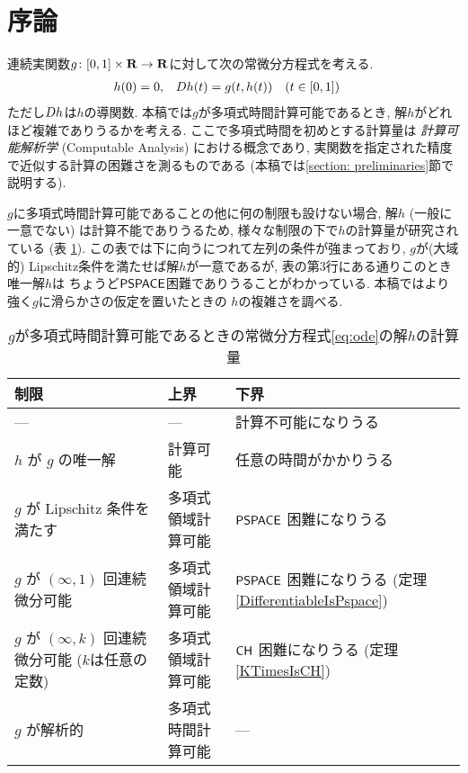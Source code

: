 \section{序論}

連続実関数$g \colon [0,1] \times \mathbf R \to \mathbf R$に対して次の常微分方程式を考える. 
\begin{align}
 \label{eq:ode}
 h(0) & = 0, &
 D h(t) & = g(t,h(t)) \quad (t \in [0,1])
\end{align}
ただし$D h$は$h$の導関数.
本稿では$g$が多項式時間計算可能であるとき, 
解$h$がどれほど複雑でありうるかを考える.
ここで多項式時間を初めとする計算量は
\emph{計算可能解析学} (Computable Analysis) 
\cite{weihrauch00:_comput_analy}における概念であり, 
実関数を指定された精度で近似する計算の困難さを測るものである
(本稿では\ref{section: preliminaries}節で説明する). 

$g$に多項式時間計算可能であることの他に何の制限も設けない場合, 
解$h$ (一般に一意でない) は計算不能でありうるため,
様々な制限の下で$h$の計算量が研究されている (表 \ref{table:related}).
この表では下に向うにつれて左列の条件が強まっており, 
$g$が(大域的) Lipschitz条件を満たせば解$h$が一意であるが, 
表の第3行にある通りこのとき唯一解$h$は
ちょうど$\mathsf{PSPACE}$困難でありうることがわかっている\cite{kawamura2010lipschitz}. 
本稿ではより強く$g$に滑らかさの仮定を置いたときの
$h$の複雑さを調べる. 

\begin{table}
\renewcommand\arraystretch{1.3}
\begin{center}
 \caption{$g$が多項式時間計算可能であるときの常微分方程式\eqref{eq:ode}の解$h$の計算量}
 \label{table:related}
 \begin{tabular}{lll}
  制限 & 上界 & 下界 \\
  \hline
   --- & --- & 計算不可能になりうる \cite{pour1979computable} \\
  $h$ が $g$ の唯一解 & 計算可能 \cite{coddington1955theory}
  & 任意の時間がかかりうる \cite{ko1983computational, miller1970recursive} \\
  $g$ が Lipschitz 条件を満たす & 多項式領域計算可能 \cite{ko1983computational}
      &	$\mathsf{PSPACE}$ 困難になりうる \cite{kawamura2010lipschitz}\\
  $g$ が $(\infty, 1)$ 回連続微分可能 & 多項式領域計算可能 & \parbox[t]{14zw}{$\mathsf{PSPACE}$ 困難になりうる\\{}(定理\ref{DifferentiableIsPspace})} \\
  \parbox[t]{14zw}{$g$ が $(\infty, k)$ 回連続微分可能\\{}($k$は任意の定数)}
  & 多項式領域計算可能 & \parbox[t]{14zw}{$\mathsf{CH}$ 困難になりうる\\{}(定理\ref{KTimesIsCH})} \\
  $g$ が解析的 
  & 多項式時間計算可能 \cite{muller1987uniform, ko1988computing, kawamura2010complexity} 
  & ---
 \end{tabular}
\end{center}
\end{table}

